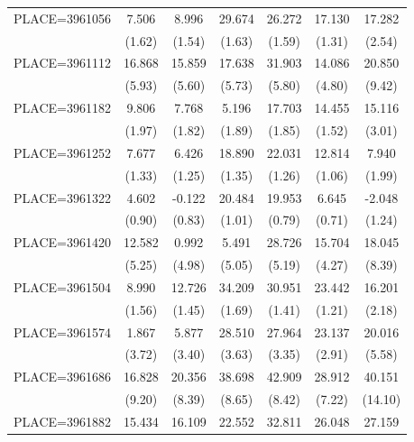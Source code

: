 {\begin{tabular}{l*{6}{c}}
PLACE=3961056       &       7.506&       8.996&      29.674&      26.272&      17.130&      17.282\\
                    &      (1.62)&      (1.54)&      (1.63)&      (1.59)&      (1.31)&      (2.54)\\
PLACE=3961112       &      16.868&      15.859&      17.638&      31.903&      14.086&      20.850\\
                    &      (5.93)&      (5.60)&      (5.73)&      (5.80)&      (4.80)&      (9.42)\\
PLACE=3961182       &       9.806&       7.768&       5.196&      17.703&      14.455&      15.116\\
                    &      (1.97)&      (1.82)&      (1.89)&      (1.85)&      (1.52)&      (3.01)\\
PLACE=3961252       &       7.677&       6.426&      18.890&      22.031&      12.814&       7.940\\
                    &      (1.33)&      (1.25)&      (1.35)&      (1.26)&      (1.06)&      (1.99)\\
PLACE=3961322       &       4.602&      -0.122&      20.484&      19.953&       6.645&      -2.048\\
                    &      (0.90)&      (0.83)&      (1.01)&      (0.79)&      (0.71)&      (1.24)\\
PLACE=3961420       &      12.582&       0.992&       5.491&      28.726&      15.704&      18.045\\
                    &      (5.25)&      (4.98)&      (5.05)&      (5.19)&      (4.27)&      (8.39)\\
PLACE=3961504       &       8.990&      12.726&      34.209&      30.951&      23.442&      16.201\\
                    &      (1.56)&      (1.45)&      (1.69)&      (1.41)&      (1.21)&      (2.18)\\
PLACE=3961574       &       1.867&       5.877&      28.510&      27.964&      23.137&      20.016\\
                    &      (3.72)&      (3.40)&      (3.63)&      (3.35)&      (2.91)&      (5.58)\\
PLACE=3961686       &      16.828&      20.356&      38.698&      42.909&      28.912&      40.151\\
                    &      (9.20)&      (8.39)&      (8.65)&      (8.42)&      (7.22)&     (14.10)\\
PLACE=3961882       &      15.434&      16.109&      22.552&      32.811&      26.048&      27.159\\

\end{tabular}}
